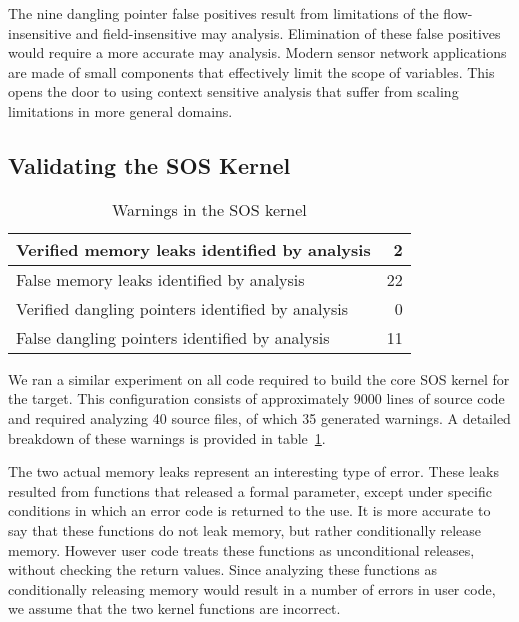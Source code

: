 \smallskip{}

The nine dangling pointer false positives result from limitations of
the flow-insensitive and field-insensitive may analysis.  Elimination
of these false positives would require a more accurate may analysis.
Modern sensor network applications are made of small components that
effectively limit the scope of variables.  This opens the door to using
context sensitive analysis that suffer from scaling limitations in
more general domains.


\subsection{Validating the SOS Kernel}

\begin{table}
\caption{Warnings in the SOS kernel}
%
\label{tab:kernel}
\centering 
\begin{tabular}{| l | r |}
    \hline 
    Verified memory leaks identified by analysis & 2 \\
    \hline
    False memory leaks identified by analysis & 22 \\
    \hline 
    Verified dangling pointers identified by analysis & 0 \\
    \hline 
    False dangling pointers identified by analysis & 11 \\
    \hline 
\end{tabular} 
%
\end{table}


We ran a similar experiment on all code required to build the core 
SOS kernel for the  target.  This configuration consists
of approximately 9000 lines of source code and required analyzing 40
source files, of which 35 generated warnings.  A detailed breakdown of
these warnings is provided in table~\ref{tab:kernel}.

The two actual memory leaks represent an interesting type of error.
These leaks resulted from functions that released a formal parameter,
except 
%
%
under specific conditions in which 
%
an error code is returned to the use.
%
It is more accurate to say that these functions do not leak
memory, but rather conditionally release memory.  However user code
treats these functions as unconditional releases, without checking
the return values.  Since analyzing these functions as conditionally 
releasing memory would 
result in a number of errors in user code, we assume that the two
kernel functions are incorrect.


